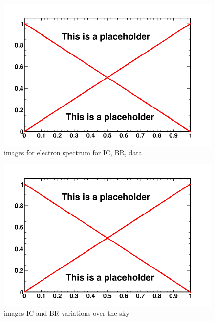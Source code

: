 \begin{figure}
 \centering
 \includegraphics[width=.9\linewidth]{pic/dummy.png}
 \caption{images for electron spectrum for IC, BR, data}
 \label{fig:electron_spec}
\end{figure}
\begin{figure}
 \centering
 \includegraphics[width=.9\linewidth]{pic/dummy.png}
 \caption{images IC and BR variations over the sky}
 \label{fig:el_variations}
\end{figure}

